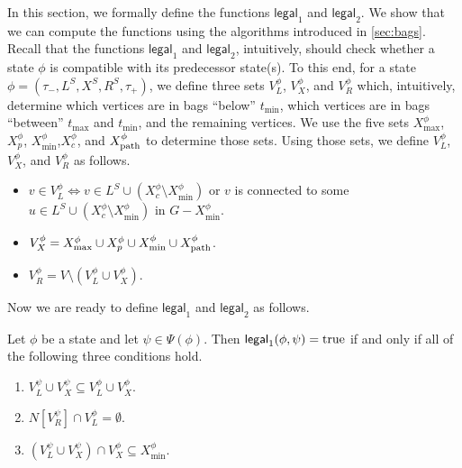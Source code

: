 \documentclass[a4paper,UKenglish,cleveref, autoref, thm-restate, numberwithinsect]{lipics-v2021}
\newcounter{algorithm}
\newcommand{\legal}{\mathsf{legal}}
\newcommand{\dpath}{\textup{path}}
\newcommand{\true}{\textup{true}}
\begin{document}
In this section, we formally define the functions $\legal_1$ and $\legal_2$. We show that we can compute the functions using the algorithms introduced in \cref{sec:bags}. Recall that the functions $\legal_1$ and $\legal_2$, intuitively, should check whether a state $\phi$ is compatible with its predecessor state(s). To this end, for a state $\phi=(\tau_-,L^S, X^S, R^S,\tau_+)$, we define three sets $V^\phi_L$, $V^\phi_X$, and $V^\phi_R$ which, intuitively, determine which vertices are in bags ``below'' $t_{\min}$, which vertices are in bags ``between'' $t_{\max}$ and $t_{\min}$, and the remaining vertices.
We use the five sets $X^\phi_{\max}$, $X^\phi_p$, $X^\phi_{\min}$,$X^\phi_c$, and $X^\phi_{\dpath}$ to determine those sets. Using those sets, we define $V^\phi_L$, $V^\phi_X$, and $V^\phi_R$ as follows.
\begin{itemize}
\item $v\in V^\phi_L\Leftrightarrow v\in L^S\cup (X^\phi_c\setminus X^\phi_{\min})$ or $v$ is connected to some $u\in L^S\cup (X^\phi_c\setminus X^\phi_{\min})$ in $G-X^\phi_{\min}$.
\item $V^\phi_X=X^\phi_{\max}\cup X^\phi_p\cup X^\phi_{\min}\cup X^\phi_{\dpath}$.
\item $V^\phi_R=V\setminus (V^\phi_L\cup V^\phi_X)$.
\end{itemize}

Now we are ready to define $\legal_1$ and $\legal_2$ as follows.

\begin{definition}[$\legal_1$]\label{def:legal1}
Let $\phi$ be a state and let $\psi\in\Psi(\phi)$.
Then $\legal_1(\phi,\psi)=\true$ if and only if all of the following three conditions hold.
\begin{enumerate}
\item $V^\psi_L\cup V^\psi_X\subseteq V^\phi_L\cup V^\phi_X$.
\item $N[V^\psi_R]\cap V^\phi_L=\emptyset$.
\item $(V^\psi_L\cup V^\psi_X)\cap V^\phi_X\subseteq X^\phi_{\min}$.
\end{enumerate}
\end{definition}
\end{document}
